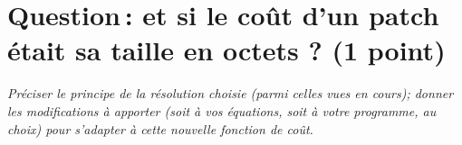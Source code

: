 \documentclass[a4paper, 10pt, english]{article}
\begin{document}
\section{Question\,: et  si le coût d'un patch était sa taille en octets ? (1 point)}
{\em Préciser le principe de la résolution choisie (parmi celles vues en cours); donner  les modifications à apporter (soit à vos  équations, soit à votre programme, au choix) 
pour s'adapter à cette nouvelle fonction de coût. 
}
\end{document}
